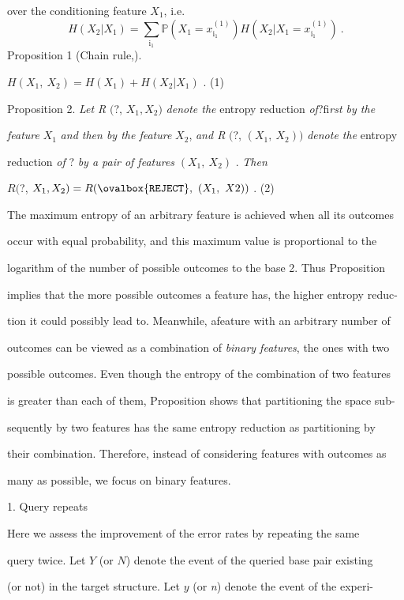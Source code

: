 \documentclass[a4paper,12pt]{article}
\begin{document}
over the conditioning feature $X_{1}$, i.e.
$$
H(X_{2}|X_{1})=\sum_{\mathrm{i}_{1}}\mathbb{P}(X_{1}=x_{\mathrm{i}_{1}}^{(1)})H(X_{2}|X_{1}=x_{\mathrm{i}_{1}}^{(1)})\ .
$$
Proposition 1 (Chain rule,).
\begin{center}
$H(X_{1},\ X_{2})=H(X_{1})+H(X_{2}|X_{1})$ .   (1)
\end{center}
Proposition 2. {\it Let R} $($?, $X_{1}, X_{2})$ {\it denote the} entropy reduction {\it of}?fi{\it rst by the}

{\it feature} $X_{1}$ {\it and then by the feature} $X_{2}$, {\it and R} $($?, $(X_{1},\ X_{2}))$ {\it denote the} entropy

reduction {\it of} ? {\it by a pair of features} $(X_{1},\ X_{2})$ . {\it Then}
\begin{center}
$R ($?, $X_{1}, X_{2})=R(\ovalbox{\tt\small REJECT},\ (X_{1},\ X2))$ .   (2)
\end{center}
The maximum entropy of an arbitrary feature is achieved when all its outcomes

occur with equal probability, and this maximum value is proportional to the

logarithm of the number of possible outcomes to the base 2. Thus Proposition

implies that the more possible outcomes a feature has, the higher entropy reduc-

tion it could possibly lead to. Meanwhile, afeature with an arbitrary number of

outcomes can be viewed as a combination of {\it binary features}, the ones with two

possible outcomes. Even though the entropy of the combination of two features

is greater than each of them, Proposition shows that partitioning the space sub-

sequently by two features has the same entropy reduction as partitioning by

their combination. Therefore, instead of considering features with outcomes as

many as possible, we focus on binary features.

1. Query repeats

Here we assess the improvement of the error rates by repeating the same

query twice. Let $Y$ (or $N$) denote the event of the queried base pair existing

(or not) in the target structure. Let $y$ (or {\it n}) denote the event of the experi-
\end{document}
